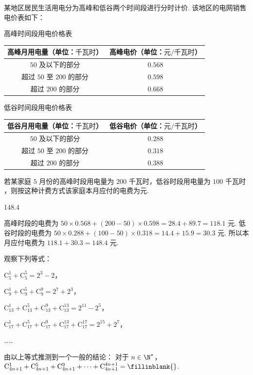 \begin{problem}
某地区居民生活用电分为高峰和低谷两个时间段进行分时计价. 该地区的电网销售电价表如下：

\begin{center}
高峰时间段用电价格表

\begin{tabular}{|c|c|}
\hline
高峰月用电量（单位：\(\text{千瓦时}\)） & 高峰电价（单位：\(\text{元}/\text{千瓦时}\)） \\
\hline
\(50\) 及以下的部分 & \(0.568\) \\
\hline
超过 \(50\) 至 \(200\) 的部分 & \(0.598\) \\
\hline
超过 \(200\) 的部分 & \(0.668\) \\
\hline
\end{tabular}

\vspace{0.7em}

低谷时间段用电价格表

\begin{tabular}{|c|c|}
\hline
低谷月用电量（单位：\(\text{千瓦时}\)） & 低谷电价（单位：\(\text{元}/\text{千瓦时}\)） \\
\hline
\(50\) 及以下的部分 & \(0.288\) \\
\hline
超过 \(50\) 至 \(200\) 的部分 & \(0.318\) \\
\hline
超过 \(200\) 的部分 & \(0.388\) \\
\hline
\end{tabular}
\end{center}

若某家庭 \(5\) 月份的高峰时段用电量为 \(200\text{ 千瓦时}\)，低谷时段用电量为 \(100\text{ 千瓦时}\)，则按这种计费方式该家庭本月应付的电费为\fillinblank{}\(\text{元}\).
\end{problem}

\begin{answer}
148.4
\end{answer}

\begin{solution}
高峰时段的电费为 \(50\times0.568+(200-50)\times0.598=28.4+89.7=118.1\) 元. 低谷时段的电费为 \(50\times0.288+(100-50)\times0.318=14.4+15.9=30.3\) 元. 所以本月应付电费为 \(118.1+30.3=148.4\) 元.
\end{solution}

\begin{problem}
观察下列等式：

\(\mathrm C_5^1+\mathrm C_5^5 = 2^3-2\)，

\(\mathrm C_9^1+\mathrm C_9^5+\mathrm C_9^9 = 2^7+2^3\)，

\(\mathrm C_{13}^1+\mathrm C_{13}^5+\mathrm C_{13}^9+\mathrm C_{13}^{13} = 2^{11}-2^5\)，

\(\mathrm C_{17}^1+\mathrm C_{17}^5+\mathrm C_{17}^9+\mathrm C_{17}^{13}+\mathrm C_{17}^{17} = 2^{15}+2^7\)，


……

由以上等式推测到一个一般的结论：
对于 \(n\in\N^*\)，\(\mathrm C_{4n+1}^1+\mathrm C_{4n+1}^5+\mathrm C_{4n+1}^9+\cdots+\mathrm C_{4n+1}^{4n+1}=\fillinblank{}\).
\end{problem}

